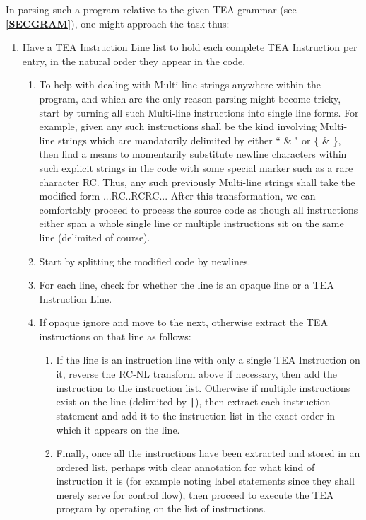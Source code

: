 \documentclass[a4paper, 18pt]{book} %
\begin{document}
In parsing such a program relative to the given TEA grammar (see \textbf{\autoref{SECGRAM}}), one might approach the task thus:

\begin{enumerate}
\item{ Have a TEA Instruction Line list to hold each complete TEA Instruction per entry, in the natural order they appear in the code.

\begin{enumerate}
\item{
To help with dealing with Multi-line strings anywhere within the program, and which are the only reason parsing might become tricky, start by turning all such Multi-line instructions into single line forms. For example, given any such instructions shall be the kind involving Multi-line strings which are mandatorily delimited by either `` \& " or \{ \& \}, then find a means to momentarily substitute newline characters within such explicit strings in the code with some special marker such as a rare character RC. Thus, any such previously Multi-line strings shall take the modified form {...RC..RCRC...} After this transformation, we can comfortably proceed to process the source code as though all instructions either span a whole single line or multiple instructions sit on the same line (delimited of course).
}
\item Start by splitting the modified code by newlines.
\item For each line, check for whether the line is an opaque line or a TEA Instruction Line.
\item{ If opaque ignore and move to the next, otherwise extract the TEA instructions on that line as follows:

\begin{enumerate}
\item{
If the line is an instruction line with only a single TEA Instruction on it, reverse the RC-NL transform above if necessary, then add the instruction to the instruction list. Otherwise if multiple instructions exist on the line (delimited by \texttt{|}), then extract each instruction statement and add it to the instruction list in the exact order in which it appears on the line. 
}
\item {
Finally, once all the instructions have been extracted and stored in an ordered list, perhaps with clear annotation for what kind of instruction it is (for example noting label statements since they shall merely serve for control flow), then proceed to execute the TEA program by operating on the list of instructions. 
}
\end{enumerate}
}
\end{enumerate}

}
\end{enumerate}
\end{document}
